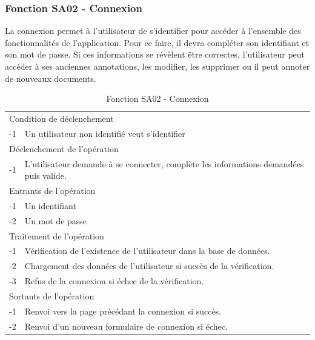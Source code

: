 \documentclass[a4paper]{article}
\begin{document}
    
\subsubsection{Fonction SA02 - Connexion}

La connexion permet à l’utilisateur de s’identifier pour accéder à l’ensemble des fonctionnalités de l’application. Pour ce faire, il devra compléter son identifiant et son mot de passe. Si ces informations se révèlent être correctes, l’utilisateur peut accéder à ses anciennes annotations, les modifier, les supprimer ou il peut annoter de nouveaux documents.

\begin{table}[H]
  \centering
   \small
	\begin{tabular}{|c|p{12cm}|}
   		\hline
   			\rowcolor{lightgray}\multicolumn{2}{|c|}{\textbf{Fonction SA02 - Connexion}} \\
   		\hline
   			\multicolumn{2}{|l|}{Condition de déclenchement} \\
   		\hline
   			-1 & Un utilisateur non identifié veut s'identifier\\
   		\hline
   			\multicolumn{2}{|l|}{Déclenchement de l'opération} \\
   		\hline
   			-1 & L'utilisateur demande à se connecter, complète les informations demandées puis valide.\\
   		\hline
   			\multicolumn{2}{|l|}{Entrants de l'opération} \\
   		\hline
   			-1 & Un identifiant\\
        	-2 & Un mot de passe\\
   		\hline
   			\multicolumn{2}{|l|}{Traitement de l'opération} \\
  		\hline
   			-1 & Vérification de l’existence de l'utilisateur dans la base de données.\\
        	-2 & Chargement des données de l'utilisateur si succès de la vérification.\\
        	-3 & Refus de la connexion si échec de la vérification.\\
   		\hline
   			\multicolumn{2}{|l|}{Sortants de l'opération} \\
   		\hline
   			-1 & Renvoi vers la page précédant la connexion si succès.\\
            -2 & Renvoi d'un nouveau formulaire de connexion si échec.\\
   		\hline
	\end{tabular}
  \caption{Fonction SA02 - Connexion}
  \normalsize
  \label{tab: connexion}
\end{table}
\end{document}
